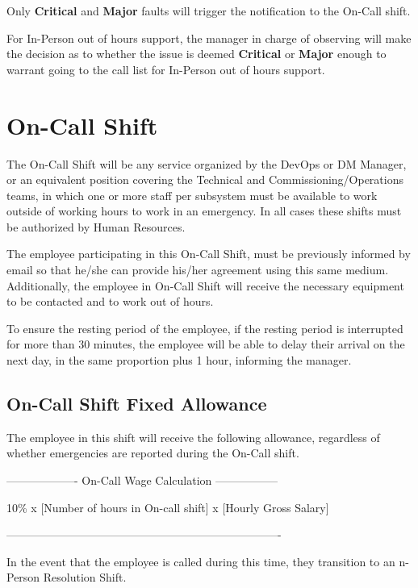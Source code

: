 Only \textbf{Critical} and \textbf{Major} faults will trigger the notification to the On-Call shift.

For In-Person out of hours support, the manager in charge of observing will make the decision as to whether the issue is deemed \textbf{Critical} or \textbf{Major} enough to warrant going to the call list for In-Person out of hours support.


\section{On-Call Shift}

The On-Call Shift will be any service organized by the DevOps or DM Manager, or an equivalent position covering the Technical and Commissioning/Operations teams, in which one or more staff per subsystem must be available to work outside of working hours to work in an emergency.
In all cases these shifts must be authorized by Human Resources.

The employee participating in this On-Call Shift, must be previously informed by email so that he/she can provide his/her agreement using this same medium. Additionally, the employee in On-Call Shift will receive the necessary equipment to be contacted and to work out of hours.

To ensure the resting period of the employee, if the resting period is interrupted for more than 30 minutes, the employee will be able to delay their arrival on the next day, in the same proportion plus 1 hour, informing the manager.

\subsection{On-Call Shift Fixed Allowance}

The employee in this shift will receive the following allowance, regardless of whether emergencies are reported during the On-Call shift.

\begin{center} -------------------  On-Call Wage Calculation ----------------- \end{center}
10\% x [Number of hours in On-call shift] x [Hourly Gross Salary]
\begin{center} ------------------------------------------------------------------------- \end{center}

In the event that the employee is called during this time, they transition to an n-Person Resolution Shift.

